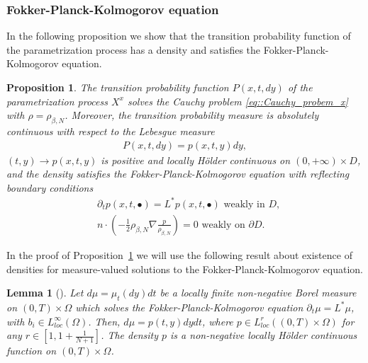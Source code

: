 \documentclass[11pt]{article}
\numberwithin{equation}{section}
\newtheorem{lemma}[theorem]{Lemma}
\newtheorem{proposition}[theorem]{Proposition}
\theoremstyle{definition}
\begin{document}
\subsubsection*{Fokker-Planck-Kolmogorov equation}
In the following proposition we show that the transition probability function of the parametrization process has a density and satisfies the Fokker-Planck-Kolmogorov equation.
\begin{proposition}\label{prop::FPK_X_process}
The transition probability function $P(x,t,dy)$ of the parametrization process $X^{x}$ solves the Cauchy problem \eqref{eq::Cauchy_probem_x} with $\rho=\rho_{\beta, N}$. Moreover, the transition probability measure is absolutely continuous with respect to the Lebesgue measure 
\begin{align*}
    P(x,t,dy) = p(x,t,y)dy,
\end{align*}
$(t,y)\to p(x,t,y)$ is positive and locally Hölder continuous on $(0,+\infty)\times D$, and the density satisfies the Fokker-Planck-Kolmogorov equation with reflecting boundary conditions
\begin{align*}
    &\partial_{t}p(x,t,\bullet)=L^{*}p(x,t,\bullet) \text{ weakly in }D,\\
    &n\cdot\left(-\frac{1}{2}\rho_{\beta, N}\nabla \frac{p}{\rho_{\beta, N}} \right) = 0 \text{ weakly on }\partial D.
\end{align*}
\end{proposition}
In the proof of Proposition~\ref{prop::FPK_X_process} we will use the following result about existence of densities for measure-valued solutions to the Fokker-Planck-Kolmogorov equation.
\begin{lemma}[\cite{bogachev2015FPK}]\label{lem::existence_of_density}
Let $d\mu = \mu_{t}(dy)dt$ be a locally finite non-negative Borel measure on $(0,T)\times \Omega$ which solves the Fokker-Planck-Kolmogorov equation $\partial_{t}\mu = L^{*}\mu$, with $b_{i}\in L^\infty_{loc}(\Omega )$. Then, 
$d\mu = p(t,y)dydt$, where $p\in L^{r}_{loc}((0,T)\times \Omega)$ for any $r\in [1,1+\frac{1}{N+1}]$. The density $p$ is a non-negative locally Hölder continuous function on $(0,T)\times \Omega$.
\end{lemma}
\end{document}
